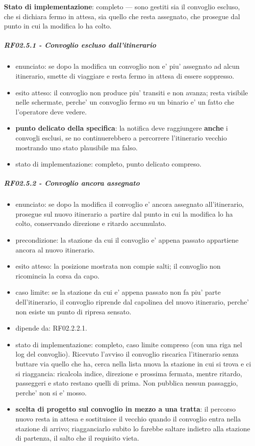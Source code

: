 \documentclass[11pt]{article}
\begin{document}
\textbf{Stato di implementazione}: completo — sono gestiti sia il convoglio escluso, che si dichiara fermo
in attesa, sia quello che resta assegnato, che prosegue dal punto in cui la modifica lo ha colto.
\subparagraph{RF02.5.1 - Convoglio escluso dall'itinerario}
\label{sec:orgef124d4}
\begin{itemize}
\item enunciato: se dopo la modifica un convoglio non e' piu' assegnato ad alcun itinerario, smette di
viaggiare e resta fermo in attesa di essere soppresso.
\item esito atteso: il convoglio non produce piu' transiti e non avanza; resta visibile nelle schermate,
perche' un convoglio fermo su un binario e' un fatto che l'operatore deve vedere.
\item \textbf{punto delicato della specifica}: la notifica deve raggiungere \textbf{anche} i convogli esclusi, se no
continuerebbero a percorrere l'itinerario vecchio mostrando uno stato plausibile ma falso.
\item stato di implementazione: completo, punto delicato compreso.
\end{itemize}
\subparagraph{RF02.5.2 - Convoglio ancora assegnato}
\label{sec:orge6570bd}
\begin{itemize}
\item enunciato: se dopo la modifica il convoglio e' ancora assegnato all'itinerario, prosegue sul nuovo
itinerario a partire dal punto in cui la modifica lo ha colto, conservando direzione e ritardo
accumulato.
\item precondizione: la stazione da cui il convoglio e' appena passato appartiene ancora al nuovo
itinerario.
\item esito atteso: la posizione mostrata non compie salti; il convoglio non ricomincia la corsa da capo.
\item caso limite: se la stazione da cui e' appena passato non fa piu' parte dell'itinerario, il convoglio
riprende dal capolinea del nuovo itinerario, perche' non esiste un punto di ripresa sensato.
\item dipende da: RF02.2.2.1.
\item stato di implementazione: completo, caso limite compreso (con una riga nel log del convoglio).
Ricevuto l'avviso il convoglio riscarica l'itinerario senza buttare via quello che ha, cerca nella
lista nuova la stazione in cui si trova e ci si riaggancia: ricalcola indice, direzione e prossima
fermata, mentre ritardo, passeggeri e stato restano quelli di prima. Non pubblica nessun
passaggio, perche' non si e' mosso.
\item \textbf{scelta di progetto sul convoglio in mezzo a una tratta}: il percorso nuovo resta in attesa e
sostituisce il vecchio quando il convoglio entra nella stazione di arrivo; riagganciarlo subito
lo farebbe saltare indietro alla stazione di partenza, il salto che il requisito vieta.
\end{itemize}
\end{document}
